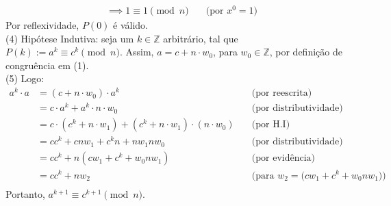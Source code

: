 \begin{enumerate}
\begin{align*}
				&\implies 1 \equiv 1 \pmod{n} &\quad \text{(por $x^0 = 1$)}
			\end{align*}
		Por reflexividade, $P(0)$ é válido. \\
		(4) Hipótese Indutiva: seja um $k \in \mathbb{Z}$ arbitrário, tal que $P(k):= a^k \equiv c^k \pmod{n}$. Assim, $a = c + n \cdot w_0$, para $w_0 \in \mathbb{Z}$, por definição de congruência em (1). \\
		(5) Logo: 
		\begin{align*}
			a^k \cdot a &= (c + n \cdot w_0) \cdot a^k &\quad \text{(por reescrita)} \\ 
			&= c \cdot a^k + a^k \cdot n \cdot w_0 &\quad \text{(por distributividade)} \\
			&= c \cdot (c^k + n \cdot w_1) + (c^k + n \cdot w_1) \cdot (n \cdot w_0) &\quad \text{(por H.I)} \\
			&= cc^k + cnw_1 + c^kn + nw_1nw_0 &\quad \text{(por distributividade)} \\
			&= cc^k + n(cw_1 + c^k + w_0nw_1) &\quad \text{(por evidência)} \\
			&= cc^k + nw_2 &\quad \text{(para $w_2 = (cw_1 + c^k + w_0nw_1$))} \\
		\end{align*}
		Portanto, $a^{k+1} \equiv c^{k+1} \pmod{n}$.
\end{enumerate}


